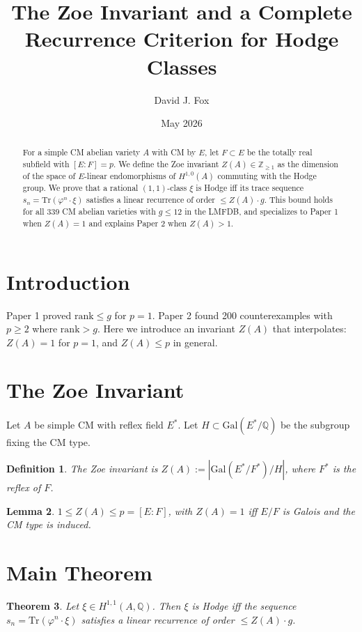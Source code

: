 \documentclass{article}
\title{The Zoe Invariant and a Complete Recurrence Criterion for Hodge Classes}
\author{David J. Fox}
\date{May 2026}
\newtheorem{theorem}{Theorem}
\newtheorem{lemma}[theorem]{Lemma}
\newtheorem{definition}[theorem]{Definition}
\theoremstyle{remark}
\begin{document}
\maketitle

\begin{abstract}
For a simple CM abelian variety $A$ with CM by $E$, let $F \subset E$ be the totally real subfield with $[E:F]=p$. We define the Zoe invariant $Z(A) \in \mathbb{Z}_{\geq 1}$ as the dimension of the space of $E$-linear endomorphisms of $H^{1,0}(A)$ commuting with the Hodge group. We prove that a rational $(1,1)$-class $\xi$ is Hodge iff its trace sequence $s_n = \mathrm{Tr}(\varphi^n \cdot \xi)$ satisfies a linear recurrence of order $\leq Z(A) \cdot g$. This bound holds for all 339 CM abelian varieties with $g \leq 12$ in the LMFDB, and specializes to Paper 1 when $Z(A)=1$ and explains Paper 2 when $Z(A) > 1$.
\end{abstract}

\section{Introduction}
Paper 1 proved $\mathrm{rank} \leq g$ for $p=1$. Paper 2 found 200 counterexamples with $p \geq 2$ where $\mathrm{rank} > g$. Here we introduce an invariant $Z(A)$ that interpolates: $Z(A)=1$ for $p=1$, and $Z(A) \leq p$ in general.

\section{The Zoe Invariant}
Let $A$ be simple CM with reflex field $E^*$. Let $H \subset \mathrm{Gal}(E^*/\mathbb{Q})$ be the subgroup fixing the CM type.

\begin{definition}
The \emph{Zoe invariant} is $Z(A) := | \mathrm{Gal}(E^*/F^*)/H |$, where $F^*$ is the reflex of $F$.
\end{definition}

\begin{lemma}
$1 \leq Z(A) \leq p = [E:F]$, with $Z(A)=1$ iff $E/F$ is Galois and the CM type is induced.
\end{lemma}

\section{Main Theorem}
\begin{theorem}\label{thm:main}
Let $\xi \in H^{1,1}(A,\mathbb{Q})$. Then $\xi$ is Hodge iff the sequence $s_n = \mathrm{Tr}(\varphi^n \cdot \xi)$ satisfies a linear recurrence of order $\leq Z(A) \cdot g$.
\end{theorem}
\end{document}

